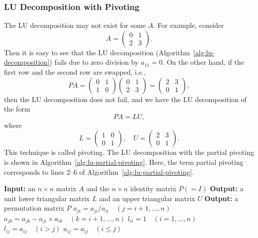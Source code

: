 \subsubsection{{LU Decomposition with Pivoting}}\label{subsec:lu-pivoting}
{The LU decomposition may not exist for some $A$. For example, consider}
\[
A=\begin{pmatrix}0&1\\2&3\end{pmatrix}.
\]
{Then it is easy to see that the LU decomposition (Algorithm~\ref{alg:lu-decomposition}) fails due to zero division by $a_{11}=0$. On the other hand, if the first row and the second row are swapped, i.e.,}
\[
PA=\begin{pmatrix}0&1\\1&0\end{pmatrix}\begin{pmatrix}0&1\\2&3\end{pmatrix}
=\begin{pmatrix}2&3\\0&1\end{pmatrix},
\]
{then the LU decomposition does not fail, and we have the LU decomposition of the form}
\[PA=LU,\]
{where}
\[
L=\begin{pmatrix}1&0\\0&1\end{pmatrix},\quad U=\begin{pmatrix}2&3\\0&1\end{pmatrix}.
\]
{This technique is called pivoting.}
{The LU decomposition with the partial pivoting is shown in Algorithm~\ref{alg:lu-partial-pivoting}. Here, the term partial pivoting corresponds to lines 2--6 of Algorithm~\ref{alg:lu-partial-pivoting}.}
\begin{algorithm}[H]
\caption{{The LU decomposition with partial pivoting}}\label{alg:lu-partial-pivoting}
\begin{algorithmic}[1]
\Statex \textbf{Input:} {an $n\times n$ matrix $A$ and the $n\times n$ identity matrix $P(=I)$}
\Statex \textbf{Output:} {a unit lower triangular matrix $L$ and an upper triangular matrix $U$}
\Statex \textbf{Output:} {a permutation matrix $P$}
\EndIf
\State $a_{ji}=a_{ji}/a_{ii}\quad(j=i+1,\ldots,n)$
\State $a_{jk}=a_{jk}-a_{ji}\times a_{ik}\quad(k=i+1,\ldots,n)$
\EndFor
\EndFor
\State $l_{ii}=1\quad(i=1,\ldots,n)$
\State $l_{ij}=a_{ij}\quad(i>j)$
\State $u_{ij}=a_{ij}\quad(i\le j)$
\end{algorithmic}
\end{algorithm}
